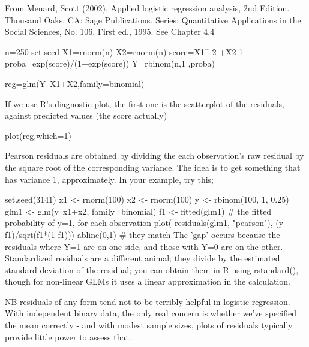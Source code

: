 From Menard, Scott (2002). Applied logistic regression analysis, 2nd Edition. Thousand Oaks, CA: Sage Publications. Series: Quantitative Applications in the Social Sciences, No. 106. First ed., 1995. See Chapter 4.4


n=250
set.seed
X1=rnorm(n)
X2=rnorm(n)
score=X1^ 2 +X2-1
proba=exp(score)/(1+exp(score))
Y=rbinom(n,1 ,proba)

reg=glm(Y~X1+X2,family=binomial)


If we use R’s diagnostic plot, the first one is the scatterplot of the residuals, against predicted values (the score actually)

plot(reg,which=1)





Pearson residuals are obtained by dividing the each observation's raw residual by the square root of the corresponding variance. The idea is to get something that has variance 1, approximately. In your example, try this;

set.seed(3141)
x1 <- rnorm(100)
x2 <- rnorm(100)
y <- rbinom(100, 1, 0.25)
glm1 <- glm(y~x1+x2, family=binomial)
f1 <- fitted(glm1) # the fitted probability of y=1, for each observation
plot( residuals(glm1, "pearson"), (y-f1)/sqrt(f1*(1-f1)))
abline(0,1)        # they match
The 'gap' occurs because the residuals where Y=1 are on one side, and those with Y=0 are on the other. Standardized residuals are a different animal; they divide by the estimated standard deviation of the residual; you can obtain them in R using rstandard(), though for non-linear GLMs it uses a linear approximation in the calculation.

NB residuals of any form tend not to be terribly helpful in logistic regression. With independent binary data, the only real concern is whether we've specified the mean correctly - and with modest sample sizes, plots of residuals typically provide little power to assess that.
